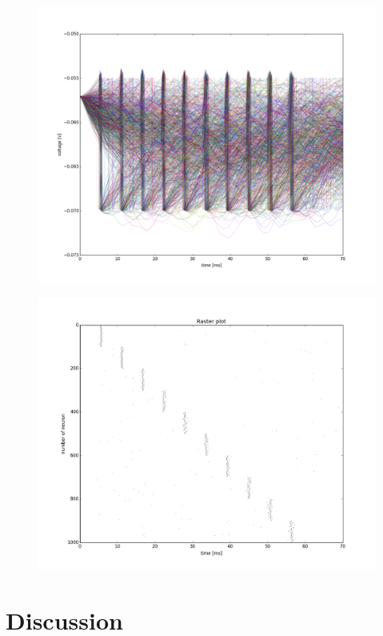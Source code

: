 \documentclass[12pt,a4paper, bibliography=totoc, listof=numbered, footexclude, BCOR=8.25mm, twoside]{scrartcl}
\begin{document}
  \begin{figure}
  \centering
  \includegraphics[width=1.0\linewidth]{./Plots/Our_Plots/voltageplot}
  \caption{}
  \label{fig:voltageplot}
  \end{figure}

  \begin{figure}
  \centering
  \includegraphics[width=0.7\linewidth]{./Plots/Our_Plots/rasterplot}
  \caption{}
  \label{fig:rasterplot}
  \end{figure}




  \section{Discussion}
 
\end{document}
